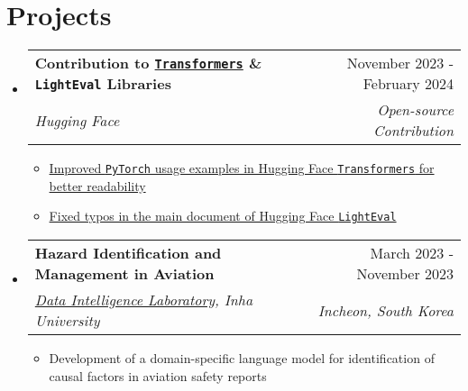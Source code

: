 \documentclass[letterpaper,11pt]{article}
\makeatletter
\newcommand{\resumeSubheading}[4]{
  \vspace{-1pt}\item
    \begin{tabular*}{0.97\textwidth}{l@{\extracolsep{\fill}}r}
      #1 & #2 \\
      \textit{\small#3} & \textit{\small #4} \\
    \end{tabular*}\vspace{-5pt}
}
\makeatother
\begin{document}
    \section{Projects}
    \begin{itemize}[leftmargin=*,label=]     

    
        \resumeSubheading
        {\textbf{Contribution to \texttt{\href{https://github.com/huggingface/transformers}{Transformers}} \& \texttt{LightEval} Libraries}}{November 2023 - February 2024}
            {Hugging Face}{Open-source Contribution}
            \begin{itemize}[label=\bullet]
                \item{\href{https://github.com/huggingface/transformers/pull/27184}{Improved \texttt{PyTorch} usage examples in Hugging Face \texttt{Transformers} for better readability}}

                \item{\href{https://github.com/huggingface/lighteval/pull/29}{Fixed typos in the main document of Hugging Face \texttt{LightEval}}}
            \end{itemize}
            
        \resumeSubheading
        {\textbf{Hazard Identification and Management in Aviation}}{March 2023 - November 2023}
            {\href{http://dilab.inha.ac.kr/}{Data Intelligence Laboratory}, Inha University}{Incheon, South Korea}
            \begin{itemize}[label=\bullet]
                \item{Development of a domain-specific language model for identification of causal factors in aviation safety reports}
            \end{itemize}



\end{itemize}
\end{document}
